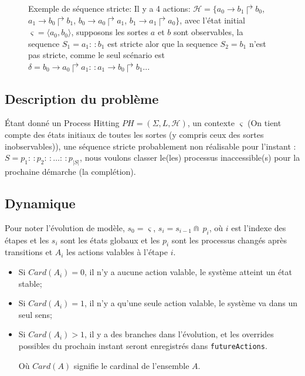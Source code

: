 \documentclass[11pt]{report}
\theoremstyle{definition}
\begin{document}
\begin{figure}[ht]
\centering
{}
\caption{Exemple de s\'equence stricte:
Il y a 4 actions: $\mathscr{H}=\{a_0\to b_1\Rsh b_0$, $a_1\to b_0\Rsh b_1$, $b_0\to a_0\Rsh a_1$, $b_1\to a_1\Rsh a_0\}$, avec l'\'etat initial $\varsigma=\langle a_0, b_0\rangle$, supposons les sortes $a$ et $b$ sont observables, la sequence $S_1=a_1:\,:b_1$ est stricte alor que la sequence $S_2=b_1$ n'est pas stricte, comme le seul sc\'enario est $\delta=b_0\to a_0\Rsh a_1:\,:a_1\to b_0\Rsh b_1...$
}
\end{figure}
\subsection{Description du probl\`eme}
\'Etant donn\'e un Process Hitting $PH=(\Sigma, L, \mathscr{H})$, un contexte $\varsigma$ (On tient compte des \'etats initiaux de toutes les sortes (y compris ceux des sortes inobservables)), une s\'equence stricte probablement non r\'ealisable pour l'instant : $S=p_1:\,:p_2:\,:\ldots:\,:p_{|S|}$, nous voulons classer le(les) processus inaccessible(s) pour la prochaine d\'emarche (la compl\'etion).
\subsection{Dynamique}
Pour noter l'\'evolution de mod\`ele, $s_0=\varsigma$, $s_i=s_{i-1}\Cap\ p_i$, o\`u $i$ est l'indexe des \'etapes et les $s_i$ sont les \'etats globaux et les $p_i$ sont les processus chang\'es apr\`es transitions et $A_i$ les actions valables \`a l'\'etape $i$.

\begin{itemize}
\item Si $Card(A_i) = 0$, il n'y a aucune action valable, le syst\`eme atteint un \'etat stable;
\item Si $Card(A_i) = 1$, il n'y a qu'une seule action valable, le syst\`eme va dans un seul sens;
\item Si $Card(A_i) > 1$, il y a des branches dans l'\'evolution, et les overrides possibles du prochain instant seront enregistr\'es dans \texttt{futureActions}.

O\`u $Card(A)$ signifie le cardinal de l'ensemble $A$.
\end{itemize}
\end{document}
